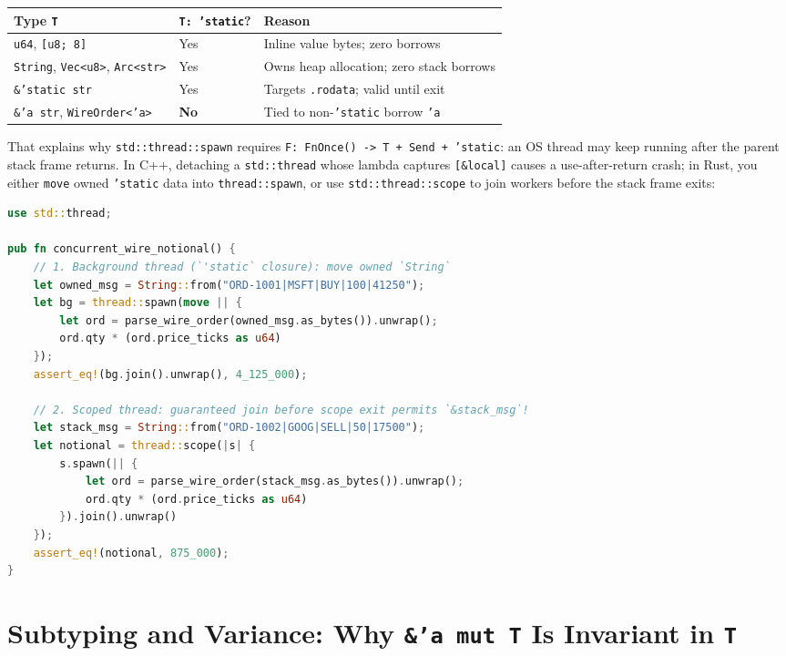 \begin{center}
\small
\begin{tabular}{@{}lll@{}}
\toprule
\textbf{Type \texttt{T}} & \textbf{\texttt{T:\ 'static}?} & \textbf{Reason} \\
\midrule
\texttt{u64}, \texttt{[u8; 8]} & Yes & Inline value bytes; zero borrows \\
\texttt{String}, \texttt{Vec<u8>}, \texttt{Arc<str>} & Yes & Owns heap allocation; zero stack borrows \\
\texttt{\&'static str} & Yes & Targets \texttt{.rodata}; valid until exit \\
\texttt{\&'a str}, \texttt{WireOrder<'a>} & \textbf{No} & Tied to non-\texttt{'static} borrow \texttt{'a} \\
\bottomrule
\end{tabular}
\end{center}

That explains why \texttt{std::\allowbreak{}thread::\allowbreak{}spawn} requires \texttt{F: FnOnce() -> T + Send + 'static}: an OS thread may keep running after the parent stack frame returns. In C++, detaching a \texttt{std::thread} whose lambda captures \texttt{[\&local]} causes a use-after-return crash; in Rust, you either \texttt{move} owned \texttt{'static} data into \texttt{thread::spawn}, or use \texttt{std::\allowbreak{}thread::\allowbreak{}scope} to join workers before the stack frame exits:

\begin{lstlisting}[language=Rust]
use std::thread;

pub fn concurrent_wire_notional() {
    // 1. Background thread (`'static` closure): move owned `String`
    let owned_msg = String::from("ORD-1001|MSFT|BUY|100|41250");
    let bg = thread::spawn(move || {
        let ord = parse_wire_order(owned_msg.as_bytes()).unwrap();
        ord.qty * (ord.price_ticks as u64)
    });
    assert_eq!(bg.join().unwrap(), 4_125_000);

    // 2. Scoped thread: guaranteed join before scope exit permits `&stack_msg`!
    let stack_msg = String::from("ORD-1002|GOOG|SELL|50|17500");
    let notional = thread::scope(|s| {
        s.spawn(|| {
            let ord = parse_wire_order(stack_msg.as_bytes()).unwrap();
            ord.qty * (ord.price_ticks as u64)
        }).join().unwrap()
    });
    assert_eq!(notional, 875_000);
}
\end{lstlisting}

\section{Subtyping and Variance: Why \texttt{\&'a mut T} Is Invariant in \texttt{T}}
\label{ch04:subtyping-variance}

